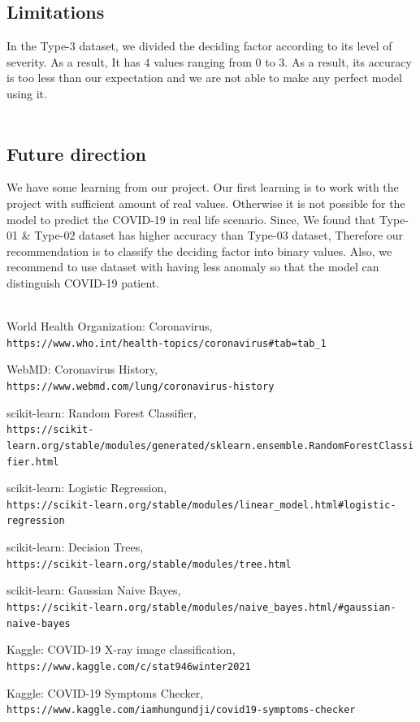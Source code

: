 \documentclass[letterpaper,11pt]{article}
\begin{document}
\subsection{Limitations}
In the Type-3 dataset, we divided the deciding factor according to its level of severity. As a result, It has 4 values ranging from 0 to 3. As a result, its accuracy is too less than our expectation and we are not able to make any perfect model using it.\\
\\
\subsection{Future direction}
We have some learning from our project. Our first learning is to work with the project with sufficient amount of real values. Otherwise it is not possible for the model to predict the COVID-19 in real life scenario. Since, We found that Type-01 & Type-02 dataset has higher accuracy than Type-03 dataset, Therefore our recommendation is to classify the deciding factor into binary values. Also, we recommend to use dataset with having less anomaly so that the model can distinguish COVID-19 patient.\\ 
\\



\medskip
\begin{thebibliography}{99}

World Health Organization: Coronavirus,
\\\texttt{https://www.who.int/health-topics/coronavirus\#tab=tab\_1}

WebMD: Coronavirus History,
\\\texttt{https://www.webmd.com/lung/coronavirus-history}

scikit-learn: Random Forest Classifier,
\\\texttt{https://scikit-learn.org/stable/modules/generated/sklearn.ensemble.RandomForestClassifier.html}

scikit-learn: Logistic Regression,
\\\texttt{https://scikit-learn.org/stable/modules/linear\_model.html\#logistic-regression}

scikit-learn: Decision Trees,
\\\texttt{https://scikit-learn.org/stable/modules/tree.html}

scikit-learn: Gaussian Naive Bayes,
\\\texttt{https://scikit-learn.org/stable/modules/naive_bayes.html/#gaussian-naive-bayes}

Kaggle: COVID-19 X-ray image classification,
\\\texttt{https://www.kaggle.com/c/stat946winter2021}

Kaggle: COVID-19 Symptoms Checker,
\\\texttt{https://www.kaggle.com/iamhungundji/covid19-symptoms-checker}

\end{thebibliography}
\end{document}
